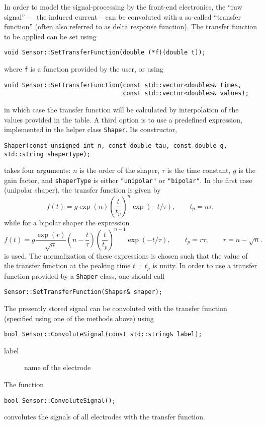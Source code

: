 In order to model the signal-processing by the front-end electronics, the 
``raw signal'' -- \ie~the induced current -- 
can be convoluted with a so-called ``transfer function'' (often also referred 
to as delta response function). 
The transfer function to be applied can be set using
\begin{lstlisting}
void Sensor::SetTransferFunction(double (*f)(double t));
\end{lstlisting}
where \texttt{f} is a function provided by the user, or using
\begin{lstlisting}
void Sensor::SetTransferFunction(const std::vector<double>& times,
                                 const std::vector<double>& values);
\end{lstlisting}
in which case the transfer function will be calculated by 
interpolation of the values provided in the table.
A third option is to use a predefined expression, implemented in 
the helper class \texttt{Shaper}. Its constructor,
\begin{lstlisting}
Shaper(const unsigned int n, const double tau, const double g, std::string shaperType);
\end{lstlisting}
takes four arguments: $n$ is the order of the shaper, 
$\tau$ is the time constant, $g$ is the gain factor, 
and \texttt{shaperType} is either \texttt{"unipolar"} or \texttt{"bipolar"}.
In the first case (unipolar shaper), the transfer function is given by
\begin{equation*}
  f\left(t\right) = g \exp\left(n\right)\left(\frac{t}{t_{p}}\right)^{n}
                    \exp\left(-t / \tau\right), \qquad t_{p} = n\tau,
\end{equation*} 
while for a bipolar shaper the expression
\begin{equation*}
  f\left(t\right) = g \frac{\exp\left(r\right)}{\sqrt{n}} \left(n - \frac{t}{\tau}\right)
                    \left(\frac{t}{t_{p}}\right)^{n - 1} 
                    \exp\left(-t / \tau\right), \qquad t_{p} = r\tau, \qquad r = n - \sqrt{n}.
\end{equation*}
is used. The normalization of these expressions is chosen such that the  
value of the transfer function at the peaking time $t = t_{p}$ is unity.
In order to use a transfer function provided by a \texttt{Shaper} class,
one should call
\begin{lstlisting}
Sensor::SetTransferFunction(Shaper& shaper);
\end{lstlisting}

The presently stored signal can be convoluted with the 
transfer function (specified using one of the methods above) using 
\begin{lstlisting}
bool Sensor::ConvoluteSignal(const std::string& label);
\end{lstlisting}
\begin{description}
  \item[label] name of the electrode
\end{description}
The function
\begin{lstlisting}
bool Sensor::ConvoluteSignal();
\end{lstlisting}
convolutes the signals of all electrodes with the transfer function.

